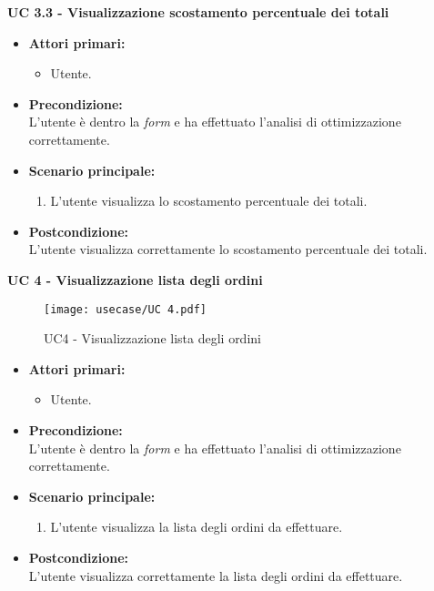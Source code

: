 \vspace{0.4cm}

\noindent \textbf{\large UC 3.3 - Visualizzazione scostamento percentuale dei totali}
\label{uc:visualizzazione-scostamento-percentuale-totali}
\begin{itemize}

	\item \textbf{Attori primari: }
		\begin{itemize}
			\item Utente.
		\end{itemize}

	\item \textbf{Precondizione: }\\[0.3cm]
		L'utente è dentro la \textit{form} e ha effettuato l'analisi di ottimizzazione correttamente.

	\item \textbf{Scenario principale: }
		\begin{enumerate}
			\item L'utente visualizza lo scostamento percentuale dei totali.
		\end{enumerate}
		

	\item \textbf{Postcondizione: }\\[0.3cm]
		L'utente visualizza correttamente lo scostamento percentuale dei totali.

\end{itemize}

\vspace{0.4cm}

\newpage

\noindent \textbf{\large UC 4 - Visualizzazione lista degli ordini}
\begin{figure}[!h] 
    \centering 
    \texttt{[image: usecase/UC 4.pdf]} 
    \caption{UC4 - Visualizzazione lista degli ordini}
\end{figure}
\label{uc:visualizzazione-lista-ordini}
\begin{itemize}

	\item \textbf{Attori primari: }
		\begin{itemize}
			\item Utente.
		\end{itemize}

	\item \textbf{Precondizione: }\\[0.3cm]
		L'utente è dentro la \textit{form} e ha effettuato l'analisi di ottimizzazione correttamente.

	\item \textbf{Scenario principale: }
		\begin{enumerate}
			\item L'utente visualizza la lista degli ordini da effettuare.
		\end{enumerate}
		

	\item \textbf{Postcondizione: }\\[0.3cm]
		L'utente visualizza correttamente la lista degli ordini da effettuare.

\end{itemize}

